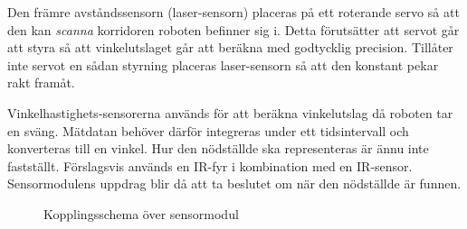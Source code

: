 \documentclass[11pt]{article}
\begin{document}
\begin{flushleft}
Den främre avståndssensorn (laser-sensorn) placeras på ett roterande servo så att den kan \emph{scanna} korridoren roboten befinner sig i. Detta förutsätter att servot går att styra så att vinkelutslaget går att beräkna med godtycklig precision. Tillåter inte servot en sådan styrning placeras laser-sensorn så att den konstant pekar rakt framåt.

Vinkelhastighets-sensorerna används för att beräkna vinkelutslag då roboten tar en sväng. Mätdatan behöver därför integreras under ett tidsintervall och konverteras till en vinkel. Hur den nödställde ska representeras är ännu inte fastställt. Förslagsvis används en IR-fyr i kombination med en IR-sensor. Sensormodulens uppdrag blir då att ta beslutet om när den nödställde är funnen.

\begin{figure}[htbp]
\centering
\noindent{}
	\caption{Kopplingsschema över sensormodul \label{kopplingsschema:sensormodul}}	
\end{figure}
 

\end{flushleft}
\end{document}
